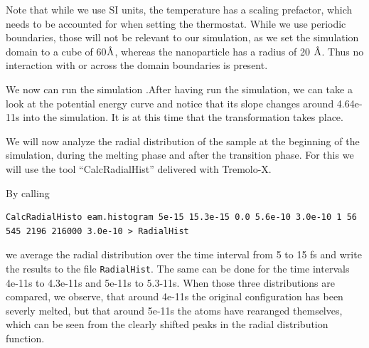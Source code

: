 Note that while we use SI units, the temperature has a scaling prefactor, which needs to be accounted for when setting the thermostat.  While we use periodic boundaries, those will not be relevant to our simulation, as we 
set the simulation domain to a cube of 60$\text{\normalfont\AA}$, whereas the nanoparticle has a radius of 20 $\text{\normalfont\AA}$. Thus no interaction with or across the domain boundaries is present.

We now can run the simulation .After having run the simulation, we can take a look at the potential energy curve and notice that its slope changes around 4.64e-11s into the simulation. It is at this time that
the transformation takes place.

We will now analyze the radial distribution of the sample at the beginning of the simulation, during the melting phase and after the transition phase.
For this we will use the tool ``CalcRadialHist'' delivered with Tremolo-X.

By calling 
\begin{lstlisting}
CalcRadialHisto eam.histogram 5e-15 15.3e-15 0.0 5.6e-10 3.0e-10 1 56 545 2196 216000 3.0e-10 > RadialHist
\end{lstlisting}
we average the radial distribution over the time interval from 5 to 15 fs and write the results to the file {\tt RadialHist}.
The same can be done for the time intervals 4e-11s to 4.3e-11s and  5e-11s to 5.3-11s. When those three distributions are compared,
we observe, that around 4e-11s the original configuration has been severly melted, but that around 5e-11s the atoms have rearanged themselves, 
which can be seen from the clearly shifted peaks in the radial distribution function.



